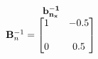 \documentclass[preview]{standalone}
\begin{document}
\begin{align*}
\begin{array}{c}\begin{matrix}\hspace{1cm} \mathbf{b^{-1}_{n_x}}  \quad \hspace{0.6cm} \end{matrix} \\  \mathbf{B}^{-1}_n = \begin{bmatrix} 1 & \quad -0.5 \\ \\0 & \quad 0.5 \end{bmatrix} \end{array}
\end{align*}
\end{document}
